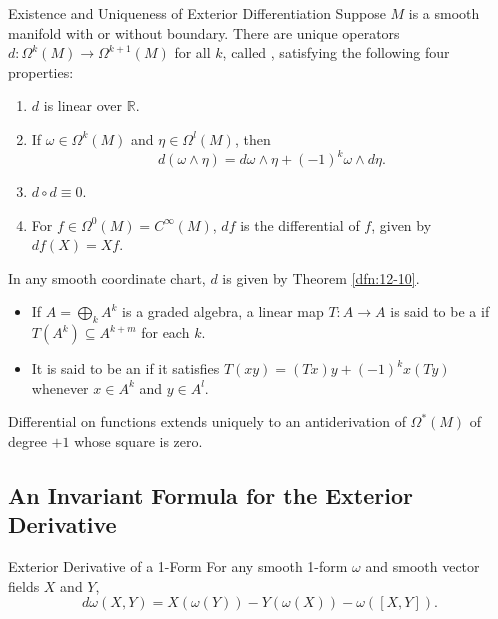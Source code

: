 \documentclass[../main.tex]{subfiles}
\begin{document}
\begin{theorem}{Existence and Uniqueness of Exterior Differentiation}{}
Suppose $M$ is a smooth manifold with or without boundary. There are unique operators $d : \Omega^k(M) \to \Omega^{k+1}(M)$ for all $k$, called , satisfying the following four properties:
\begin{enumerate}
\item[(i)] $d$ is linear over $\mathbb{R}$.
\item[(ii)] If $\omega \in \Omega^k(M)$ and $\eta \in \Omega^l(M)$, then
\[
d(\omega \wedge \eta) = d\omega \wedge \eta + (-1)^k \omega \wedge d\eta.
\]
\item[(iii)] $d \circ d \equiv 0$.
\item[(iv)] For $f \in \Omega^0(M) = C^\infty(M)$, $df$ is the differential of $f$, given by $df(X) = Xf$.
\end{enumerate}
In any smooth coordinate chart, $d$ is given by Theorem \ref{dfn:12-10}.
\end{theorem}


\begin{definition}{}{}
    \begin{itemize}
        \item If $A = \bigoplus_k A^k$ is a graded algebra, a linear map $T : A \to A$ is said to be a  if $T(A^k) \subseteq A^{k+m}$ for each $k$. 
        \item   It is said to be an  if it satisfies $T(xy) = (Tx)y + (-1)^k x(Ty)$ whenever $x \in A^k$ and $y \in A^l$. 
    \end{itemize}
  
\end{definition}

\begin{remark}
   Differential on functions extends uniquely to an antiderivation of \(   \Omega ^{*}\left( M \right)   \) of degree \(  + 1  \) whose square is zero.  
\end{remark}

\subsection{An Invariant Formula for the Exterior Derivative}

\begin{proposition}{Exterior Derivative of a 1-Form}{}
For any smooth 1-form $\omega$ and smooth vector fields $X$ and $Y$,
\begin{equation}
d\omega(X, Y) = X(\omega(Y)) - Y(\omega(X)) - \omega([X, Y]).
\end{equation}
\end{proposition}
\end{document}
